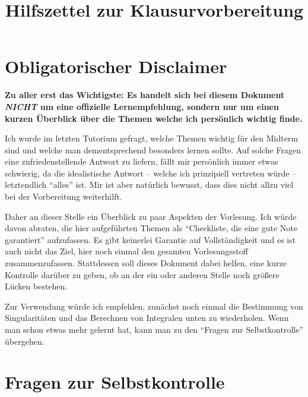 \documentclass{article}
\title{Hilfszettel zur Klausurvorbereitung}
\author{}
\date{\vspace*{-1.25cm}}
\theoremstyle{plain}
\theoremstyle{definition}
\begin{document}
\maketitle
\section{Obligatorischer Disclaimer}

\textbf{Zu aller erst das Wichtigste: Es handelt sich bei diesem Dokument \emph{NICHT} um eine offizielle Lernempfehlung, sondern nur um einen kurzen Überblick über die Themen welche ich persönlich wichtig finde.}

Ich wurde im letzten Tutorium gefragt, welche Themen wichtig für den Midterm sind und welche man dementsprechend besonders lernen sollte.
Auf solche Fragen eine zufriedenstellende Antwort zu liefern, fällt mir persönlich immer etwas schwierig, da die idealistische Antwort -- welche ich prinzipiell vertreten würde -- letztendlich \enquote{alles} ist.
Mir ist aber natürlich bewusst, dass dies nicht allzu viel bei der Vorbereitung weiterhilft.

Daher an dieser Stelle ein Überblick zu paar Aspekten der Vorlesung.
Ich würde davon abraten, die hier aufgeführten Themen als \enquote{Checkliste, die eine gute Note garantiert} aufzufassen.
Es gibt keinerlei Garantie auf Vollständigkeit und es ist auch nicht das Ziel, hier noch einmal den gesamten Vorlesungsstoff zusammenzufassen.
Stattdessen soll dieses Dokument dabei helfen, eine kurze Kontrolle darüber zu geben, ob an der ein oder anderen Stelle noch größere Lücken bestehen.

Zur Verwendung würde ich empfehlen, zunächst noch einmal die Bestimmung von Singularitäten und das Berechnen von Integralen unten zu wiederholen.
Wenn man schon etwas mehr gelernt hat, kann man zu den \enquote{Fragen zur Selbstkontrolle} übergehen.

\section{Fragen zur Selbstkontrolle}
\end{document}
